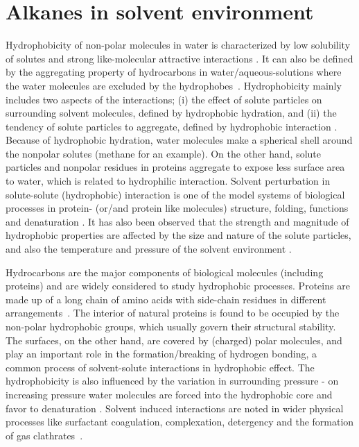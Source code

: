 \section{Alkanes  in solvent environment}
\begin{sloppypar}
Hydrophobicity of non-polar molecules in water is characterized by low solubility of solutes and strong like-molecular attractive interactions \citep{Sharp1991, Scheraga1998}. It can also be defined by the aggregating property of hydrocarbons in water/aqueous-solutions where the water molecules are excluded by the hydrophobes~\citep{IUPAC1997}. Hydrophobicity mainly includes two aspects of the interactions; (i) the effect of solute particles on surrounding solvent molecules, defined by hydrophobic hydration, and (ii) the tendency of solute particles to aggregate, defined by hydrophobic interaction \citep{Raschke2001}. Because of hydrophobic hydration, water molecules make a spherical shell around the nonpolar solutes (methane for an example). On the other hand, solute particles and nonpolar residues in proteins aggregate to expose less surface area to water, which is related to hydrophilic interaction. Solvent perturbation in solute-solute (hydrophobic) interaction is one of the model systems of biological processes in protein- (or/and protein like molecules) structure, folding, functions and denaturation \citep{Gekko1998, Hwang2011}. It has also been observed that the strength and magnitude of hydrophobic properties are affected by the size and nature of the solute particles, and also the temperature and pressure of the solvent environment \citep{Makowski2009}.
\end{sloppypar}
 
Hydrocarbons are the major components of biological molecules (including proteins) and are widely considered to study hydrophobic processes. Proteins are made up of a long chain of amino acids with side-chain residues in different arrangements~\citep{Leach2001}. The interior of natural proteins is found to be occupied by the non-polar hydrophobic groups, which usually govern their structural stability. The surfaces, on the other hand, are covered by (charged) polar molecules, and play an important role in the formation/breaking of hydrogen bonding, a common process of solvent-solute interactions in hydrophobic effect. The hydrophobicity is also influenced by the variation in surrounding pressure - on increasing pressure water molecules are forced into the hydrophobic core and favor to denaturation \citep{Hummer1998}. Solvent induced interactions are noted in wider physical processes like surfactant coagulation, complexation, detergency and the formation of gas clathrates~\citep{Sobolewski2007}. 
 
